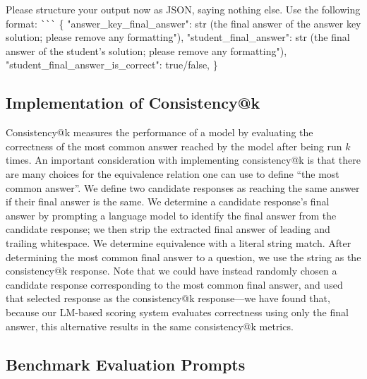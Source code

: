 \begin{tcolorbox}[breakable, title=Prompt 2]
Please structure your output now as JSON, saying nothing else. Use the following format:
\verb|```|
\{
    "answer\_key\_final\_answer": str (the final answer of the answer key solution; please remove any formatting"),
    "student\_final\_answer": str (the final answer of the student's solution; please remove any formatting"),
    "student\_final\_answer\_is\_correct": true/false,
\}
\end{tcolorbox}

\subsection{Implementation of Consistency@k}
Consistency@k measures the performance of a model by evaluating the correctness of the most common answer reached by the model after being run $k$ times.
An important consideration with implementing consistency@k is that there are many choices for the equivalence relation one can use to define ``the most common answer''.
We define two candidate responses as reaching the same answer if their final answer is the same.
We determine a candidate response's final answer by prompting a language model to identify the final answer from the candidate response; we then strip the extracted final answer of leading and trailing whitespace.
We determine equivalence with a literal string match.
After determining the most common final answer to a question, we use the string  as the consistency@k response.
Note that we could have instead randomly chosen a candidate response corresponding to the most common final answer, and used that selected response as the consistency@k response---we have found that, because our LM-based scoring system evaluates correctness using only the final answer, this alternative results in the same consistency@k metrics.

\subsection{Benchmark Evaluation Prompts}
\label{app:benchmarkprompts}

